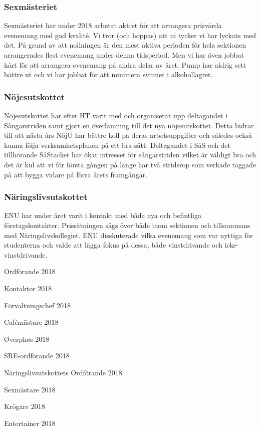 \documentclass[../_main/handlingar.tex]{subfiles}
\begin{document}
\newpage

\subsubsection*{Sexmästeriet}

Sexmästeriet har under 2018 arbetat aktivt för att arrangera prisvärda evenemang med god
kvalité. Vi tror (och hoppas) att ni tycker vi har lyckats med det. På grund av att nollningen är
den mest aktiva perioden för hela sektionen arrangerades flest evenemang under denna
tidsperiod. Men vi har även jobbat hårt för att arrangera evenemang på andra delar av året.
Pump har aldrig sett bättre ut och vi har jobbat för att minimera svinnet i alkohollagret.

\subsubsection*{Nöjesutskottet}

Nöjesutskottet har efter HT varit med och organiserat upp deltagandet i Sångarstriden samt
gjort en överlämning till det nya nöjesutskottet. Detta bidrar till att nästa års NöjU har bättre
koll på deras arbetsuppgifter och således också kunna följa verksamhetsplanen på ett bra
sätt. Deltagandet i SåS och det tillhörande SåStacket har ökat intresset för sångarstriden
vilket är väldigt bra och det är kul att vi för första gången på länge har två stridsrop som
verkade taggade på att bygga vidare på förra årets framgångar.

\subsubsection*{Näringslivsutskottet}

ENU har under året varit i kontakt med både nya och befintliga företagskontakter. Prissätningen sågs
över både inom sektionen och tillsammans med Näringslivskollegiet. ENU disskuterade vilka
evenemang som var nyttiga för studenterna och valde att lägga fokus på dessa, både vinstdrivande och
icke-vinstdrivande.

\newpage
\begin{signatures}{10}
    \mvh
    \signature{Daniel Bakic}{Ordförande 2018}
    \signature{Axel Voss}{Kontaktor 2018}
    \signature{Magnus Lundh}{Förvaltningschef 2018}
    \signature{Elin Johansson}{Cafémästare 2018}
    \signature{Andreas Bennström}{Øverphøs 2018}
    \signature{Fanny Månefjord}{SRE-ordförande 2018}
    \signature{Isabella Hansen}{Näringslivsutskottets Ordförande 2018}
    \signature{Alexander Wik}{Sexmästare 2018}
    \signature{Malin Heyden}{Krögare 2018}
    \signature{Adam Belfrage}{Entertainer 2018}
\end{signatures}
\end{document}
